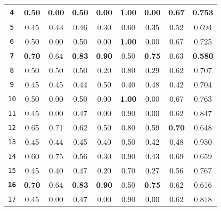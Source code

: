 \begin{table}[h]
{\begin{tabular}{|c|c|cc|cc|cc|c|}
\lstinline!4! & 0.50 & \multicolumn{1}{c|}{0.00} & 0.50 & \multicolumn{1}{c|}{0.00} & \textbf{1.00} & \multicolumn{1}{c|}{0.00} & 0.67 & 0.753 \\ \hline
\lstinline!5! & 0.45 & \multicolumn{1}{c|}{0.43} & 0.46 & \multicolumn{1}{c|}{0.30} & 0.60 & \multicolumn{1}{c|}{0.35} & 0.52 & 0.694 \\ \hline
\lstinline!6! & 0.50 & \multicolumn{1}{c|}{0.00} & 0.50 & \multicolumn{1}{c|}{0.00} & \textbf{1.00} & \multicolumn{1}{c|}{0.00} & 0.67 & 0.725 \\ \hline
\rowcolor[HTML]{32CB00} 
\textbf{\lstinline!7!} & \textbf{0.70} & \multicolumn{1}{c|}{0.64} & \textbf{0.83} & \multicolumn{1}{c|}{\textbf{0.90}} & 0.50 & \multicolumn{1}{c|}{\textbf{0.75}} & 0.63 & \textbf{0.580} \\ \hline
\lstinline!8! & 0.50 & \multicolumn{1}{c|}{0.50} & 0.50 & \multicolumn{1}{c|}{0.20} & 0.80 & \multicolumn{1}{c|}{0.29} & 0.62 & 0.707 \\ \hline
\lstinline!9! & 0.45 & \multicolumn{1}{c|}{0.45} & 0.44 & \multicolumn{1}{c|}{0.50} & 0.40 & \multicolumn{1}{c|}{0.48} & 0.42 & 0.704 \\ \hline
\lstinline!10! & 0.50 & \multicolumn{1}{c|}{0.00} & 0.50 & \multicolumn{1}{c|}{0.00} & \textbf{1.00} & \multicolumn{1}{c|}{0.00} & 0.67 & 0.763 \\ \hline
\lstinline!11! & 0.45 & \multicolumn{1}{c|}{0.00} & 0.47 & \multicolumn{1}{c|}{0.00} & 0.90 & \multicolumn{1}{c|}{0.00} & 0.62 & 0.847 \\ \hline
\lstinline!12! & 0.65 & \multicolumn{1}{c|}{0.71} & 0.62 & \multicolumn{1}{c|}{0.50} & 0.80 & \multicolumn{1}{c|}{0.59} & \textbf{0.70} & 0.648 \\ \hline
\lstinline!13! & 0.45 & \multicolumn{1}{c|}{0.44} & 0.45 & \multicolumn{1}{c|}{0.40} & 0.50 & \multicolumn{1}{c|}{0.42} & 0.48 & 0.950 \\ \hline
\lstinline!14! & 0.60 & \multicolumn{1}{c|}{0.75} & 0.56 & \multicolumn{1}{c|}{0.30} & 0.90 & \multicolumn{1}{c|}{0.43} & 0.69 & 0.659 \\ \hline
\lstinline!15! & 0.45 & \multicolumn{1}{c|}{0.40} & 0.47 & \multicolumn{1}{c|}{0.20} & 0.70 & \multicolumn{1}{c|}{0.27} & 0.56 & 0.767 \\ \hline
\rowcolor[HTML]{32CB00} 
\textbf{\lstinline!16!} & \textbf{0.70} & \multicolumn{1}{c|}{0.64} & \textbf{0.83} & \multicolumn{1}{c|}{\textbf{0.90}} & 0.50 & \multicolumn{1}{c|}{\textbf{0.75}} & 0.62 & 0.616 \\ \hline
\lstinline!17! & 0.45 & \multicolumn{1}{c|}{0.00} & 0.47 & \multicolumn{1}{c|}{0.00} & 0.90 & \multicolumn{1}{c|}{0.00} & 0.62 & 0.818 \\ \hline

\end{tabular}}
\end{table}
